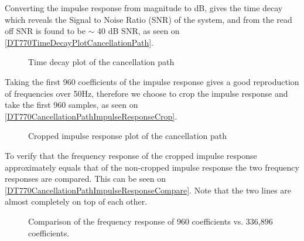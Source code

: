 Converting the impulse response from magnitude to dB, gives the time decay which reveals the Signal to Noise Ratio (SNR) of the system, and from the read off SNR is found to be $\sim$ 40 dB SNR, as seen on \autoref{DT770TimeDecayPlotCancellationPath}.


\begin{figure}[H]
	\centering
	
	\caption{Time decay plot of the cancellation path}
	\label{DT770TimeDecayPlotCancellationPath}
\end{figure}

Taking the first 960 coefficients of the impulse response gives a good reproduction of frequencies over 50Hz, therefore we choose to crop the impulse response and take the first 960 samples, as seen on \autoref{DT770CancellationPathImpulseResponseCrop}.


\begin{figure}[H]
	\centering
	
	\caption{Cropped impulse response plot of the cancellation path}
	\label{DT770CancellationPathImpulseResponseCrop}
\end{figure}

To verify that the frequency response of the cropped impulse response approximately equals that of the non-cropped impulse response the two frequency responses are compared. This can be seen on \autoref{DT770CancellationPathImpulseResponseCompare}. Note that the two lines are almost completely on top of each other.

\begin{figure}[H]
	\centering
	
	\caption{Comparison of the frequency response of 960 coefficients vs. 336,896 coefficients.}
	\label{DT770CancellationPathImpulseResponseCompare}
\end{figure}

